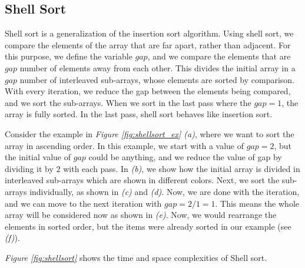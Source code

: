 \subsection{Shell Sort}

Shell sort is a generalization of the insertion sort algorithm. Using shell sort, we compare the elements of the array that are far apart, rather than adjacent. For this purpose, we define the variable $gap$, and we compare the elements that are $gap$ number of elements away from each other. This divides the initial array in a $gap$ number of interleaved sub-arrays, whose elements are sorted by comparison. With every iteration, we reduce the gap between the elements being compared, and we sort the sub-arrays. When we sort in the last pass where the $gap = 1$, the array is fully sorted. In the last pass, shell sort behaves like insertion sort.

Consider the example in \textit{Figure \ref{fig:shellsort_ex} (a)}, where we want to sort the array in ascending order. In this example, we start with a value of $gap = 2$, but the initial value of $gap$ could be anything, and we reduce the value of gap by dividing it by $2$ with each pass. In \textit{(b)}, we show how the initial array is divided in interleaved sub-arrays which are shown in different colors. Next, we sort the sub-arrays individually, as shown in \textit{(c)} and \textit{(d)}. Now, we are done with the iteration, and we can move to the next iteration with $gap = 2/1 = 1$. This means the whole array will be considered now as shown in \textit{(e)}. Now, we would rearrange the elements in sorted order, but the items were already sorted in our example (see \textit{(f)}).

\textit{Figure \ref{fig:shellsort}} shows the time and space complexities of Shell sort.

